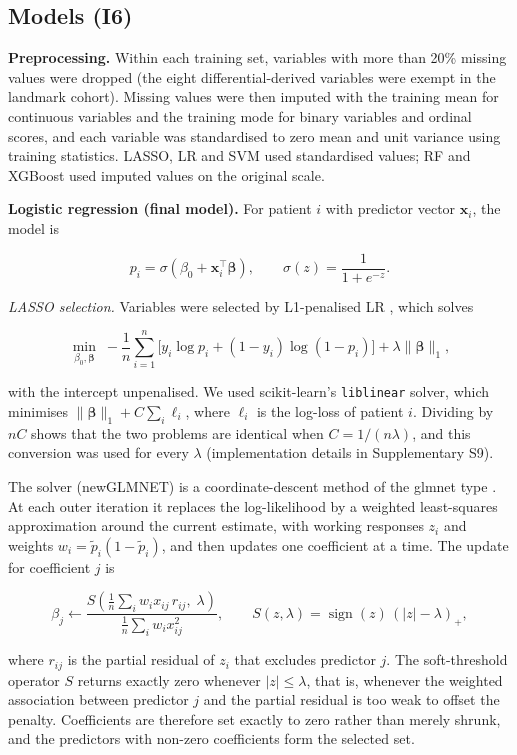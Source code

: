 \hypertarget{models-i6}{%
\subsection{Models (I6)}\label{models-i6}}

\textbf{Preprocessing.} Within each training set, variables with more than 20\%
missing values were dropped (the eight differential-derived variables were
exempt in the landmark cohort). Missing values were then imputed with the
training mean for continuous variables and the training mode for binary
variables and ordinal scores, and each variable was standardised to zero mean
and unit variance using training statistics. LASSO, LR and SVM used standardised
values; RF and XGBoost used imputed values on the original scale.

\textbf{Logistic regression (final model).} For patient \(i\) with predictor
vector \(\mathbf{x}_i\), the model is

\[p_i = \sigma(\beta_0 + \mathbf{x}_i^\top \boldsymbol\beta), \qquad \sigma(z) = \frac{1}{1 + e^{-z}}.\]

\emph{LASSO selection.} Variables were selected by L1-penalised LR
\parencite{tibshirani1996}, which solves

\[\min_{\beta_0, \boldsymbol\beta} \; -\frac{1}{n}\sum_{i=1}^{n}\big[y_i \log p_i + (1 - y_i)\log(1 - p_i)\big] + \lambda \lVert\boldsymbol\beta\rVert_1,\]

with the intercept unpenalised. We used scikit-learn's \texttt{liblinear}
solver, which minimises \(\lVert\boldsymbol\beta\rVert_1 + C\sum_i \ell_i\),
where \(\ell_i\) is the log-loss of patient \(i\). Dividing by \(nC\) shows that
the two problems are identical when \(C = 1/(n\lambda)\), and this conversion
was used for every \(\lambda\) (implementation details in Supplementary S9).

The solver (newGLMNET) is a coordinate-descent method of the glmnet type
\parencite{friedman2010,yuan2012}. At each outer iteration it replaces the
log-likelihood by a weighted least-squares approximation around the current
estimate, with working responses \(z_i\) and weights
\(w_i = \tilde p_i(1 - \tilde p_i)\), and then updates one coefficient at a
time. The update for coefficient \(j\) is

\[\beta_j \leftarrow \frac{S\!\left(\frac{1}{n}\sum_i w_i x_{ij}\, r_{ij},\; \lambda\right)}{\frac{1}{n}\sum_i w_i x_{ij}^2}, \qquad S(z, \lambda) = \operatorname{sign}(z)\,(|z| - \lambda)_+,\]

where \(r_{ij}\) is the partial residual of \(z_i\) that excludes predictor
\(j\). The soft-threshold operator \(S\) returns exactly zero whenever
\(|z| \le \lambda\), that is, whenever the weighted association between
predictor \(j\) and the partial residual is too weak to offset the penalty.
Coefficients are therefore set exactly to zero rather than merely shrunk, and
the predictors with non-zero coefficients form the selected set.

